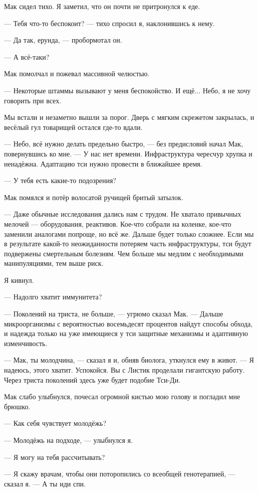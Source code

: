 Мак сидел тихо.
Я заметил, что он почти не притронулся к еде.

--- Тебя что-то беспокоит? --- тихо спросил я, наклонившись к нему.

--- Да так, ерунда, --- пробормотал он.

--- А всё-таки?

Мак помолчал и пожевал массивной челюстью.

--- Некоторые штаммы вызывают у меня беспокойство.
И ещё... Небо, я не хочу говорить при всех.

Мы встали и незаметно вышли за порог.
Дверь с мягким скрежетом закрылась, и весёлый гул товарищей остался где-то вдали.

--- Небо, всё нужно делать предельно быстро, --- без предисловий начал Мак, повернувшись ко мне.
--- У нас нет времени.
Инфраструктура чересчур хрупка и ненадёжна.
Адаптацию тси нужно провести в ближайшее время.

--- У тебя есть какие-то подозрения?

Мак помялся и потёр волосатой ручищей бритый затылок.

--- Даже обычные исследования дались нам с трудом.
Не хватало привычных мелочей --- оборудования, реактивов.
Кое-что собрали на коленке, кое-что заменили аналогами попроще, но всё же.
Дальше будет только сложнее.
Если мы в результате какой-то неожиданности потеряем часть инфраструктуры, тси будут подвержены смертельным болезням.
Чем больше мы медлим с необходимыми манипуляциями, тем выше риск.

Я кивнул.

--- Надолго хватит иммунитета?

--- Поколений на триста, не больше, --- угрюмо сказал Мак.
--- Дальше микроорганизмы с вероятностью восемьдесят процентов найдут способы обхода, и надежда только на уже имеющиеся у тси защитные механизмы и адаптивную изменчивость.

--- Мак, ты молодчина, --- сказал я и, обняв биолога, уткнулся ему в живот.
--- Я надеюсь, этого хватит.
Успокойся.
Вы с Листик проделали гигантскую работу.
Через триста поколений здесь уже будет подобие Тси-Ди.

Мак слабо улыбнулся, почесал огромной кистью мою голову и погладил мне брюшко.

--- Как себя чувствует молодёжь?

--- Молодёжь на подходе, --- улыбнулся я.

--- Я могу на тебя рассчитывать?

--- Я скажу врачам, чтобы они поторопились со всеобщей генотерапией, --- сказал я.
--- А ты иди спи.

